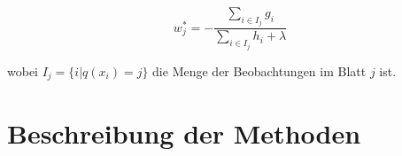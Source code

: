 \documentclass[12pt,titlepage,oneside]{book}
\begin{document}
\begin{equation}
w_j^* = -\frac{\sum_{i \in I_j} g_i}{\sum_{i \in I_j} h_i + \lambda}
\end{equation}

wobei $I_j = \{i | q(x_i) = j\}$ die Menge der Beobachtungen im Blatt $j$ ist.

%
















\pagebreak
\chapter{Beschreibung der Methoden} \label{methods}
\end{document}
